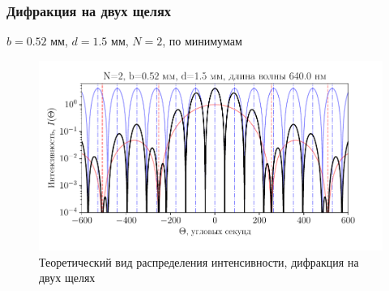 \subsubsection{Дифракция на двух щелях}

\begin{table}[H]
	    \caption{$b=0.52$ мм, $d=1.5$ мм, $N=2$, по минимумам}
	    \label{tab:chem1} 

	\mytable
	
\end{table}
\begin{figure}[H]
	\centering
	\includegraphics[]{plot/N2}
	\caption{Теоретический вид распределения интенсивности, дифракция на двух щелях}
	\label{fig:figure1}
\end{figure}
